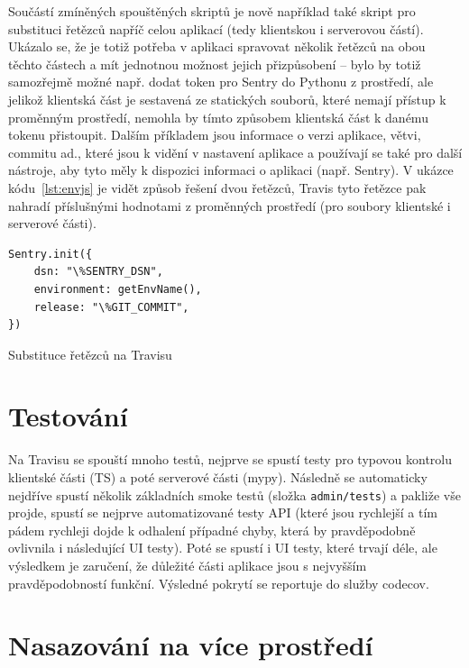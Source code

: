 Součástí zmíněných spouštěných skriptů je nově například také skript pro substituci řetězců napříč celou aplikací (tedy klientskou i serverovou částí). Ukázalo se, že je totiž potřeba v aplikaci spravovat několik řetězců na obou těchto částech a mít jednotnou možnost jejich přizpůsobení -- bylo by totiž samozřejmě možné např. dodat token pro Sentry do Pythonu z prostředí, ale jelikož klientská část je sestavená ze statických souborů, které nemají přístup k proměnným prostředí, nemohla by tímto způsobem klientská část k danému tokenu přistoupit. Dalším příkladem jsou informace o verzi aplikace, větvi, commitu ad., které jsou k vidění v nastavení aplikace a používají se také pro další nástroje, aby tyto měly k dispozici informaci o aplikaci (např. Sentry). V ukázce kódu~\ref{lst:envjs} je vidět způsob řešení dvou řetězců, Travis tyto řetězce pak nahradí příslušnými hodnotami z proměnných prostředí (pro soubory klientské i serverové části).

\begin{listing}[ht]
	\begin{verbatim}
Sentry.init({
    dsn: "\%SENTRY_DSN",
    environment: getEnvName(),
    release: "\%GIT_COMMIT",
})
	\end{verbatim}
	\caption{Substituce řetězců na Travisu}\label{lst:envjs}
\end{listing}

\section{Testování}

Na Travisu se spouští mnoho testů, nejprve se spustí testy pro typovou kontrolu klientské části (TS) a poté serverové části (mypy). Následně se automaticky nejdříve spustí několik základních smoke testů (složka \verb|admin/tests|) a pakliže vše projde, spustí se nejprve automatizované testy API (které jsou rychlejší a tím pádem rychleji dojde k odhalení případné chyby, která by pravděpodobně ovlivnila i následující UI testy). Poté se spustí i UI testy, které trvají déle, ale výsledkem je zaručení, že důležité části aplikace jsou s nejvyšším pravděpodobností funkční. Výsledné pokrytí se reportuje do služby codecov.

\section{Nasazování na více prostředí}\label{sec:nasazovani-nasazovaninaviceprostredi}

